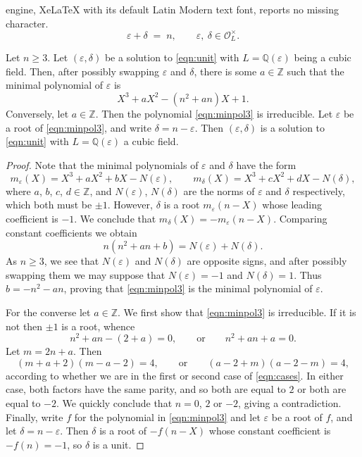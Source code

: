 \documentclass[10pt,a4paper]{amsart}
\newcommand{\OO}{\mathcal{O}}
\newcommand{\Q}{\mathbb{Q}}
\newcommand{\Z}{\mathbb{Z}}
\begin{document}
engine, XeLaTeX with its default Latin Modern text font, reports no missing character.
\begin{equation}\label{eqn:unit}
	\varepsilon+\delta \; = \; n, \qquad \varepsilon,~\delta \in \OO_L^\times.
\end{equation}

\begin{lem}\label{lem:minpol}
Let $n \ge 3$. Let $(\varepsilon,\delta)$ be a solution
	to \eqref{eqn:unit} with $L=\Q(\varepsilon)$ being
	a cubic field. Then,
	after possibly swapping $\varepsilon$ and $\delta$,
	there is some $a \in \Z$
	such that the minimal polynomial
	of $\varepsilon$ is 
	\begin{equation}\label{eqn:minpol3}
		X^3+a X^2-(n^2+an)X+1.
	\end{equation}
	Conversely, let $a \in \Z$.  Then the polynomial
	\eqref{eqn:minpol3} is irreducible. Let
	$\varepsilon$ be
	a root of \eqref{eqn:minpol3},
	and write $\delta=n-\varepsilon$. Then $(\varepsilon,\delta)$
	is a solution to \eqref{eqn:unit} with $L=\Q(\varepsilon)$
	a cubic field.
\end{lem}

\begin{proof}
	Note that the minimal polynomials of $\varepsilon$
	and $\delta$ have the form
	\begin{equation}\label{eqn:ms}
		m_\varepsilon(X)=X^3+aX^2+bX-N(\varepsilon), \qquad m_\delta(X)=X^3+cX^2+dX-N(\delta),
	\end{equation}
	where $a$, $b$, $c$, $d \in \Z$, and $N(\varepsilon)$, $N(\delta)$ are the norms of $\varepsilon$
	and $\delta$ respectively, which both must be $\pm 1$. 
	However, $\delta$ is a root $m_\varepsilon(n-X)$ whose leading
	coefficient is $-1$. We conclude that $m_\delta(X)=-m_\varepsilon(n-X)$.
	Comparing constant coefficients we obtain
	\[
		n(n^2+an+b)=N(\varepsilon)+N(\delta).
	\]
	As $n \ge 3$, we see that $N(\varepsilon)$ and $N(\delta)$
	are opposite signs, and after possibly swapping them
	we may suppose that $N(\varepsilon)=-1$ and $N(\delta)=1$.
	Thus $b=-n^2-an$, proving that \eqref{eqn:minpol3}
	is the minimal polynomial of $\varepsilon$.

	For the converse let $a \in \Z$. We first show that
	\eqref{eqn:minpol3} is irreducible. If it is not then
	$\pm 1$ is a root, whence
	\begin{equation}\label{eqn:cases}
		n^2+an-(2+a)=0, \qquad \text{or} \qquad n^2+an+a=0.
	\end{equation}
	Let $m=2n+a$. Then
	\[
		(m+a+2)(m-a-2)=4, \qquad \text{or} \qquad
		(a-2+m)(a-2-m)=4,
	\]
	according to whether we are in the first or second case of 
	\eqref{eqn:cases}. In either case, both factors
	have the same parity, and so both are equal to $2$
	or both are equal to $-2$.
	We quickly conclude that $n=0$, $2$ or $-2$, giving a contradiction.
	Finally, write $f$ for the polynomial in \eqref{eqn:minpol3}
	and let $\varepsilon$ be a root of $f$,
	and let $\delta=n-\varepsilon$. Then $\delta$ is a root 
	of $-f(n-X)$ whose constant coefficient is 
	$-f(n)=-1$, so $\delta$ is a unit.
\end{proof}
\end{document}
